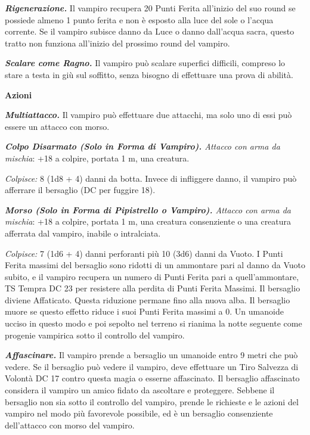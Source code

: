 \begin{multicols}{2}
	\textit{\textbf{Rigenerazione.}} Il vampiro recupera 20 Punti Ferita all'inizio del suo round se possiede almeno 1 punto ferita e non è esposto alla luce del sole o l'acqua corrente. Se il vampiro subisce danno da Luce o danno dall'acqua sacra, questo tratto non funziona all'inizio del prossimo round del vampiro.

	\textit{\textbf{Scalare come Ragno.}} Il vampiro può scalare superfici difficili, compreso lo stare a testa in giù sul soffitto, senza bisogno di effettuare una prova di abilità.

	\textbf{Azioni}

	\textit{\textbf{Multiattacco.}} Il vampiro può effettuare due attacchi, ma solo uno di essi può essere un attacco con morso.

	\textit{\textbf{Colpo Disarmato (Solo in Forma di Vampiro).} Attacco con arma da mischia}: +18 a colpire, portata 1 m, una creatura.

	\textit{Colpisce:} 8 (1d8 + 4) danni da botta. Invece di infliggere danno, il vampiro può afferrare il bersaglio (DC per fuggire 18).

	\textit{\textbf{Morso (Solo in Forma di Pipistrello o Vampiro).} Attacco con arma da mischia}: +18 a colpire, portata 1 m, una creatura consenziente o una creatura afferrata dal vampiro, inabile o intralciata.

	\textit{Colpisce:} 7 (1d6 + 4) danni perforanti più 10 (3d6) danni da Vuoto. I Punti Ferita massimi del bersaglio sono ridotti di un ammontare pari al danno da Vuoto subito, e il vampiro recupera un numero di Punti Ferita pari a quell'ammontare, TS Tempra DC 23 per resistere alla perdita di Punti Ferita Massimi. Il bersaglio diviene Affaticato. Questa riduzione permane fino alla nuova alba. Il bersaglio muore se questo effetto riduce i suoi Punti Ferita massimi a 0. Un umanoide ucciso in questo modo e poi sepolto nel terreno si rianima la notte seguente come progenie vampirica sotto il controllo del vampiro.

	\textit{\textbf{Affascinare.}} Il vampiro prende a bersaglio un umanoide entro 9 metri che può vedere. Se il bersaglio può vedere il vampiro, deve effettuare un Tiro Salvezza di Volontà DC 17 contro questa magia o esserne affascinato. Il bersaglio affascinato considera il vampiro un amico fidato da ascoltare e proteggere. Sebbene il bersaglio non sia sotto il controllo del vampiro, prende le richieste e le azioni del vampiro nel modo più favorevole possibile, ed è un bersaglio consenziente dell'attacco con morso del vampiro.


\end{multicols}
